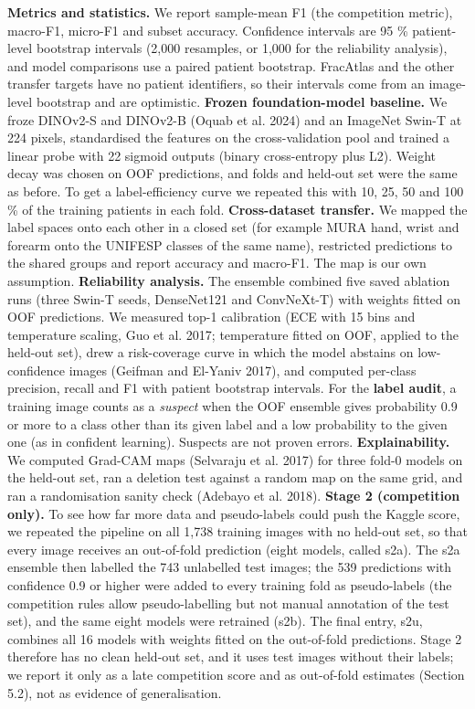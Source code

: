 \textbf{Metrics and statistics.} We report sample-mean F1 (the competition metric), macro-F1, micro-F1 and subset accuracy. Confidence intervals are 95 \% patient-level bootstrap intervals (2,000 resamples, or 1,000 for the reliability analysis), and model comparisons use a paired patient bootstrap. FracAtlas and the other transfer targets have no patient identifiers, so their intervals come from an image-level bootstrap and are optimistic.
\textbf{Frozen foundation-model baseline.} We froze DINOv2-S and DINOv2-B (Oquab et al. 2024) and an ImageNet Swin-T at 224 pixels, standardised the features on the cross-validation pool and trained a linear probe with 22 sigmoid outputs (binary cross-entropy plus L2). Weight decay was chosen on OOF predictions, and folds and held-out set were the same as before. To get a label-efficiency curve we repeated this with 10, 25, 50 and 100 \% of the training patients in each fold.
\textbf{Cross-dataset transfer.} We mapped the label spaces onto each other in a closed set (for example MURA hand, wrist and forearm onto the UNIFESP classes of the same name), restricted predictions to the shared groups and report accuracy and macro-F1. The map is our own assumption.
\textbf{Reliability analysis.} The ensemble combined five saved ablation runs (three Swin-T seeds, DenseNet121 and ConvNeXt-T) with weights fitted on OOF predictions. We measured top-1 calibration (ECE with 15 bins and temperature scaling, Guo et al. 2017; temperature fitted on OOF, applied to the held-out set), drew a risk-coverage curve in which the model abstains on low-confidence images (Geifman and El-Yaniv 2017), and computed per-class precision, recall and F1 with patient bootstrap intervals. For the \textbf{label audit}, a training image counts as a \emph{suspect} when the OOF ensemble gives probability 0.9 or more to a class other than its given label and a low probability to the given one (as in confident learning). Suspects are not proven errors.
\textbf{Explainability.} We computed Grad-CAM maps (Selvaraju et al. 2017) for three fold-0 models on the held-out set, ran a deletion test against a random map on the same grid, and ran a randomisation sanity check (Adebayo et al. 2018).
\textbf{Stage 2 (competition only).} To see how far more data and pseudo-labels could push the Kaggle score, we repeated the pipeline on all 1,738 training images with no held-out set, so that every image receives an out-of-fold prediction (eight models, called s2a). The s2a ensemble then labelled the 743 unlabelled test images; the 539 predictions with confidence 0.9 or higher were added to every training fold as pseudo-labels (the competition rules allow pseudo-labelling but not manual annotation of the test set), and the same eight models were retrained (s2b). The final entry, s2u, combines all 16 models with weights fitted on the out-of-fold predictions. Stage 2 therefore has no clean held-out set, and it uses test images without their labels; we report it only as a late competition score and as out-of-fold estimates (Section 5.2), not as evidence of generalisation.
